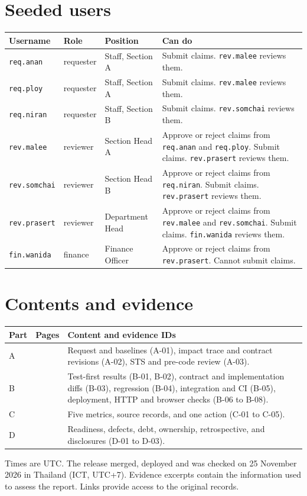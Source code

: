 \section*{Seeded users}
\begin{longtable}{@{}R{2.4cm}R{1.9cm}R{3.2cm}R{8.0cm}@{}}
\toprule
\textbf{Username} & \textbf{Role} & \textbf{Position} & \textbf{Can do} \\ \midrule
\texttt{req.anan} & requester & Staff, Section A & Submit claims. \texttt{rev.malee} reviews them. \\
\texttt{req.ploy} & requester & Staff, Section A & Submit claims. \texttt{rev.malee} reviews them. \\
\texttt{req.niran} & requester & Staff, Section B & Submit claims. \texttt{rev.somchai} reviews them. \\
\texttt{rev.malee} & reviewer & Section Head A & Approve or reject claims from \texttt{req.anan} and \texttt{req.ploy}. Submit claims. \texttt{rev.prasert} reviews them. \\
\texttt{rev.somchai} & reviewer & Section Head B & Approve or reject claims from \texttt{req.niran}. Submit claims. \texttt{rev.prasert} reviews them. \\
\texttt{rev.prasert} & reviewer & Department Head & Approve or reject claims from \texttt{rev.malee} and \texttt{rev.somchai}. Submit claims. \texttt{fin.wanida} reviews them. \\
\texttt{fin.wanida} & finance & Finance Officer & Approve or reject claims from \texttt{rev.prasert}. Cannot submit claims. \\
\bottomrule
\end{longtable}

\clearpage
\section*{Contents and evidence}
\begin{longtable}{@{}R{0.8cm}R{2.3cm}R{12.8cm}@{}}
\toprule
\textbf{Part} & \textbf{Pages} & \textbf{Content and evidence IDs} \\ \midrule
A &  & Request and baselines (A-01), impact trace and contract revisions (A-02), STS and pre-code review (A-03). \\
B &  & Test-first results (B-01, B-02), contract and implementation diffs (B-03), regression (B-04), integration and CI (B-05), deployment, HTTP and browser checks (B-06 to B-08). \\
C &  & Five metrics, source records, and one action (C-01 to C-05). \\
D &  & Readiness, defects, debt, ownership, retrospective, and disclosures (D-01 to D-03). \\
\bottomrule
\end{longtable}

Times are UTC. The release merged, deployed and was checked on 25 November 2026 in Thailand (ICT, UTC+7). Evidence excerpts contain the information used to assess the report. Links provide access to the original records.
